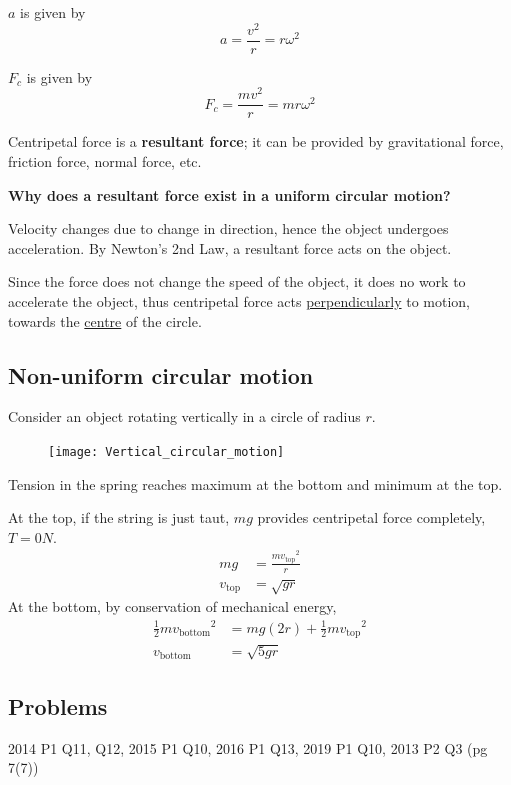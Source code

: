  $a$ is given by
\begin{equation} a = \frac{v^2}{r} = r\omega^2 \end{equation}

 $F_c$ is given by
\begin{equation} F_c = \frac{mv^2}{r} = mr\omega^2 \end{equation}
\begin{remark}
Centripetal force is a \textbf{resultant force}; it can be provided by gravitational force, friction force, normal force, etc. 
\end{remark}

\begin{tcolorbox}
\textbf{Why does a resultant force exist in a uniform circular motion?}

Velocity changes due to change in direction, hence the object undergoes acceleration. By Newton's 2nd Law, a resultant force acts on the object. 

Since the force does not change the speed of the object, it does no work to accelerate the object, thus centripetal force acts \underline{perpendicularly} to motion, towards the \underline{centre} of the circle.
\end{tcolorbox}

\subsection{Non-uniform circular motion}
Consider an object rotating vertically in a circle of radius $r$.
\begin{figure}[H]
	\centering
	\texttt{[image: Vertical\_circular\_motion]}
\end{figure}

Tension in the spring reaches maximum at the bottom and minimum at the top.

At the top, if the string is just taut, $mg$ provides centripetal force completely, $T=0 \unit{N}$.
\begin{align*}
mg &= \frac{m{v_{\text{top}}}^2}{r}\\
v_{\text{top}} &= \sqrt{gr}
\end{align*}
At the bottom, by conservation of mechanical energy,
\begin{align*}
\frac{1}{2} m{v_{\text{bottom}}}^2 &= mg(2r) + \frac{1}{2} m{v_{\text{top}}}^2\\
v_{\text{bottom}} &= \sqrt{5gr}
\end{align*}
\pagebreak

\subsection*{Problems}
2014 P1 Q11, Q12, 2015 P1 Q10, 2016 P1 Q13, 2019 P1 Q10, 
2013 P2 Q3 (pg 7(7)) 
\pagebreak